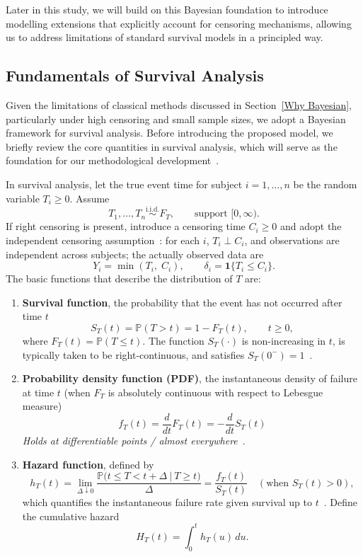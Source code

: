 Later in this study, we will build on this Bayesian foundation to introduce modelling extensions that explicitly account for censoring mechanisms, allowing us to address limitations of standard survival models in a principled way.


\subsection{Fundamentals of Survival Analysis} 
\label{Fundamentals of Survival Analysis}
Given the limitations of classical methods discussed in Section~\ref{Why Bayesian}, particularly under high censoring and small sample sizes, we adopt a Bayesian framework for survival analysis. Before introducing the proposed model, we briefly review the core quantities in survival analysis, which will serve as the foundation for our methodological development~\cite{kleinbaum1996survival}.

In survival analysis, let the true event time for subject $i=1,\dots,n$ be the random variable $T_i\ge 0$. Assume
$$
T_1,\ldots,T_n \stackrel{\text{i.i.d.}}{\sim} F_T,\qquad \text{support }[0,\infty).
$$
If right censoring is present, introduce a censoring time $C_i\ge 0$ and adopt the independent censoring assumption~\cite{kalbfleisch2002statistical}: for each $i$, $T_i\perp C_i$, and observations are independent across subjects; the actually observed data are
$$
Y_i=\min(T_i,\;C_i),\qquad \delta_i=\mathbf 1\{T_i\le C_i\}.
$$
The basic functions that describe the distribution of $T$ are:
\begin{enumerate}
    \item \textbf{Survival function}, the probability that the event has not occurred after time $t$
   \begin{equation}
       S_T(t)=\mathbb P(T>t)=1-F_T(t),\qquad t\ge 0,
   \end{equation}
   where $F_T(t)=\mathbb P(T\le t)$. The function $S_T(\cdot)$ is non-increasing in $t$, is typically taken to be right-continuous, and satisfies $S_T(0^-)=1$~\cite{ibrahim2013bayesian}.
   \item \textbf{Probability density function (PDF)}, the instantaneous density of failure at time $t$ (when $F_T$ is absolutely continuous with respect to Lebesgue measure)
   \begin{equation}
   f_T(t)=\frac{d}{dt}F_T(t)=-\frac{d}{dt}S_T(t)
  \end{equation}
\noindent\textit{Holds at differentiable points / almost everywhere}~\cite{ibrahim2013bayesian,kleinbaum1996survival}.
   \item \textbf{Hazard function}, defined by
   \begin{equation}
        h_T(t)=\lim_{\Delta\downarrow 0}\frac{\mathbb P\big(t\le T<t+\Delta\ \big|\ T\ge t\big)}{\Delta}
          =\frac{f_T(t)}{S_T(t)}\quad(\text{when }S_T(t)>0),
   \end{equation}
   which quantifies the instantaneous failure rate given survival up to $t$~\cite{kalbfleisch2002statistical, ibrahim2013bayesian}. Define the cumulative hazard \begin{equation}
       H_T(t)=\int_0^{t} h_T(u)\,du.
   \end{equation}
\end{enumerate}


